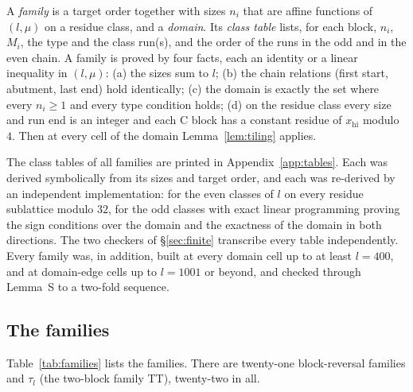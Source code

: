 \documentclass[11pt]{amsart}
\theoremstyle{plain}
\theoremstyle{definition}
\theoremstyle{remark}
\begin{document}
A \emph{family} is a target order together with sizes $n_i$ that are affine functions of
$(l,\mu)$ on a residue class, and a \emph{domain}. Its \emph{class table} lists, for each
block, $n_i$, $M_i$, the type and the class run(s), and the order of the runs in the odd
and in the even chain. A family is proved by four facts, each an identity or a linear
inequality in $(l,\mu)$: (a) the sizes sum to $l$; (b) the chain relations (first start,
abutment, last end) hold identically; (c) the domain is exactly the set where every
$n_i \ge 1$ and every type condition holds; (d) on the residue class every size and run
end is an integer and each C block has a constant residue of $x_{\mathrm{hi}}$ modulo $4$.
Then at every cell of the domain Lemma~\ref{lem:tiling} applies.

The class tables of all families are printed in Appendix~\ref{app:tables}. Each was
derived symbolically from its sizes and target order, and each was re-derived by an
independent implementation: for the even classes of $l$ on every residue sublattice
modulo $32$, for the odd classes with exact linear programming proving the sign
conditions over the domain and the exactness of the domain in both directions. The two
checkers of \S\ref{sec:finite} transcribe every table independently. Every family was,
in addition, built at every domain cell up to at least $l = 400$, and at domain-edge
cells up to $l = 1001$ or beyond, and checked through Lemma~S to a two-fold sequence.

\subsection*{The families}
Table~\ref{tab:families} lists the families. There are twenty-one block-reversal
families and $\tau_l$ (the two-block family TT), twenty-two in all.
\end{document}
